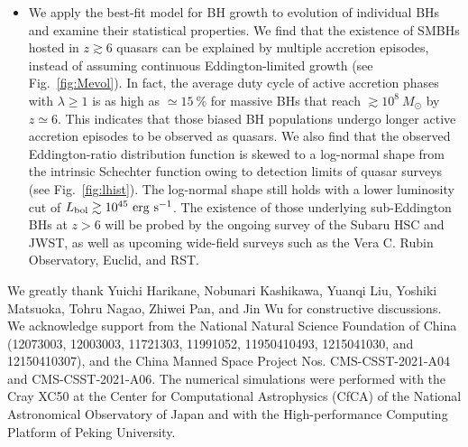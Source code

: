 \documentclass[twocolumn, twocolappendix]{aastex63}
\newcommand{\Msun}{M_\odot}
\begin{document}
\begin{CJK*}{UTF8}{gbsn}
\begin{itemize}
\item
We apply the best-fit model for BH growth to evolution of individual BHs and examine their statistical properties.
We find that the existence of SMBHs hosted in $z\gtrsim 6$ quasars can be explained by
multiple accretion episodes, instead of assuming continuous Eddington-limited growth (see Fig.~\ref{fig:Mevol}).
In fact, the average duty cycle of active accretion phases with $\lambda \geq 1$ is as high as $\simeq 15~\%$
for massive BHs that reach $\gtrsim 10^8~\Msun$ by $z\simeq 6$.
This indicates that those biased BH populations undergo longer active accretion episodes to be observed as quasars.
We also find that the observed Eddington-ratio distribution function is skewed to a log-normal shape from the intrinsic Schechter function
owing to detection limits of quasar surveys (see Fig.~\ref{fig:lhist}).
The log-normal shape still holds with a lower luminosity cut of $L_{\rm bol}\gtrsim 10^{45}~{\rm erg~s}^{-1}$.
The existence of those underlying sub-Eddington BHs at $z>6$ will be probed by the ongoing survey of the Subaru HSC and JWST,
as well as upcoming wide-field surveys such as the Vera C. Rubin Observatory, Euclid, and RST.
\end{itemize}

\acknowledgments
We greatly thank Yuichi Harikane, Nobunari Kashikawa, Yuanqi Liu, Yoshiki Matsuoka, Tohru Nagao, Zhiwei Pan, and Jin Wu for constructive discussions. 
We acknowledge support from the National Natural Science Foundation of China 
(12073003, 12003003, 11721303, 11991052, 11950410493, 1215041030, and 12150410307), 
and the China Manned Space Project Nos. CMS-CSST-2021-A04 and CMS-CSST-2021-A06. 
The numerical simulations were performed with the Cray XC50 at the Center for Computational Astrophysics (CfCA) 
of the National Astronomical Observatory of Japan and with the High-performance Computing Platform of Peking University.
%




\end{CJK*}
\end{document}
